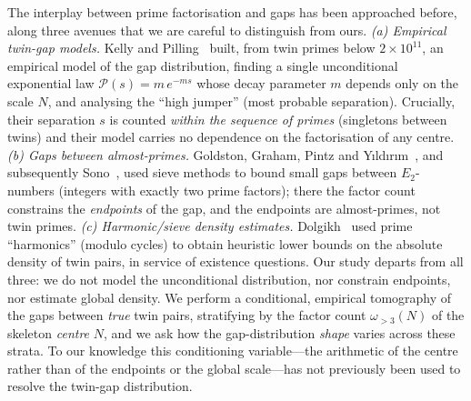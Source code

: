 \documentclass[11pt]{article}
\theoremstyle{remark}\newtheorem{remark}{Remark}
\begin{document}
The interplay between prime factorisation and gaps has been approached before,
along three avenues that we are careful to distinguish from ours. \emph{(a)
Empirical twin-gap models.} Kelly and Pilling~\cite{KP1,KP2} built, from twin
primes below $2\times10^{11}$, an empirical model of the gap distribution,
finding a single unconditional exponential law $\mathcal P(s)=m\,e^{-ms}$ whose
decay parameter $m$ depends only on the scale $N$, and analysing the ``high
jumper'' (most probable separation). Crucially, their separation $s$ is counted
\emph{within the sequence of primes} (singletons between twins) and their model
carries no dependence on the factorisation of any centre. \emph{(b) Gaps between
almost-primes.} Goldston, Graham, Pintz and Yıldırım~\cite{GGPY}, and
subsequently Sono~\cite{Sono}, used sieve methods to bound small gaps between
$E_2$-numbers (integers with exactly two prime factors); there the factor count
constrains the \emph{endpoints} of the gap, and the endpoints are almost-primes,
not twin primes. \emph{(c) Harmonic/sieve density estimates.}
Dolgikh~\cite{Dolgikh} used prime ``harmonics'' (modulo cycles) to obtain
heuristic lower bounds on the absolute density of twin pairs, in service of
existence questions. Our study departs from all three: we do not model the
unconditional distribution, nor constrain endpoints, nor estimate global
density. We perform a conditional, empirical tomography of the gaps between
\emph{true} twin pairs, stratifying by the factor count $\omega_{>3}(N)$ of the
skeleton \emph{centre} $N$, and we ask how the gap-distribution \emph{shape}
varies across these strata. To our knowledge this conditioning variable---the
arithmetic of the centre rather than of the endpoints or the global scale---has
not previously been used to resolve the twin-gap distribution.
\end{document}
